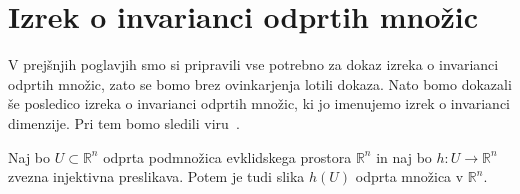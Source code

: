 \documentclass[mat1]{fmfdelo}
\newcommand{\R}{\mathbb R}
\newcommand{\0}{0}
\begin{document}
\section{Izrek o invarianci odprtih množic}\label{raz:ioiom}
V prejšnjih poglavjih smo si pripravili vse potrebno za dokaz izreka o invarianci odprtih množic, zato se bomo brez ovinkarjenja lotili dokaza. Nato bomo dokazali še posledico izreka o invarianci odprtih množic, ki jo imenujemo izrek o invarianci dimenzije. Pri tem bomo sledili viru~\cite{Kulpa}.
%
\begin{izrek}\label{izr:main-theorem}
Naj bo $U \subset \R^n$ odprta podmnožica evklidskega prostora $\R^n$ in naj bo $h : U \rightarrow \R^n$ zvezna injektivna preslikava.
Potem je tudi slika $h(U)$ odprta množica v $\R^n$.
\end{izrek}
%
\end{document}
